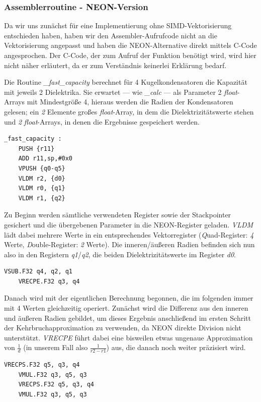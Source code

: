 \documentclass[11pt]{scrartcl}
\begin{document}
\subsubsection{Assemblerroutine - NEON-Version}

Da wir uns zunächst für eine Implementierung ohne SIMD-Vektorisierung entschieden haben, haben wir den Assembler-Aufrufcode nicht an die Vektorisierung angepasst und haben die NEON-Alternative direkt mittels C-Code angesprochen. Der C-Code, der zum Aufruf der Funktion benötigt wird, wird hier nicht näher erläutert, da er zum Verständnis keinerlei Erklärung bedarf.

Die Routine \emph{\_fast\_capacity} berechnet für 4 Kugelkondensatoren die Kapazität mit jeweils 2 Dielektrika. Sie erwartet --- wie \emph{\_calc} --- als Parameter 2 \emph{float}-Arrays mit Mindestgröße 4, hieraus werden die Radien der Kondensatoren gelesen; ein \emph{2} Elemente großes \emph{float}-Array, in dem die Dielektrizitätswerte stehen und \emph{2} \emph{float}-Arrays, in denen die Ergebnisse gespeichert werden.
\\
\begin{lstlisting}[language={[x86masm]Assembler}]
_fast_capacity :
	PUSH {r11}
	ADD r11,sp,#0x0
	VPUSH {q0-q5}
	VLDM r2, {d0}
	VLDM r0, {q1}
	VLDM r1, {q2}
\end{lstlisting}
Zu Beginn werden sämtliche verwendeten Register sowie der Stackpointer gesichert und die übergebenen Parameter in die NEON-Register geladen. \emph{VLDM} lädt dabei mehrere Werte in ein entsprechendes Vektorregister (\emph{Q}uad-Register: \emph{4} Werte, \emph{D}ouble-Register: \emph{2} Werte). Die inneren/äußeren Radien befinden sich nun also in den Registern \emph{q1}/\emph{q2}, die beiden Dielektrizitätswerte im Register \emph{d0}.
\\
\begin{lstlisting}[language={[x86masm]Assembler}]
	VSUB.F32 q4, q2, q1
	VRECPE.F32 q3, q4
\end{lstlisting}
Danach wird mit der eigentlichen Berechnung begonnen, die im folgenden immer mit 4 Werten gleichzeitig operiert. Zunächst wird die Differenz aus den inneren und äußeren Radien gebildet, um dieses Ergebnis anschließend im ersten Schritt der Kehrbruchapproximation zu verwenden, da NEON direkte Division nicht unterstützt. \emph{VRECPE} führt dabei eine bisweilen etwas ungenaue Approximation von $\frac{1}{d}$ (in unserem Fall also $\frac{1}{r2-r1}$) aus, die danach noch weiter präzisiert wird.
\\
\begin{lstlisting}[language={[x86masm]Assembler}]
	VRECPS.F32 q5, q3, q4
	VMUL.F32 q3, q5, q3
	VRECPS.F32 q5, q3, q4
	VMUL.F32 q3, q5, q3
\end{lstlisting}
\end{document}
